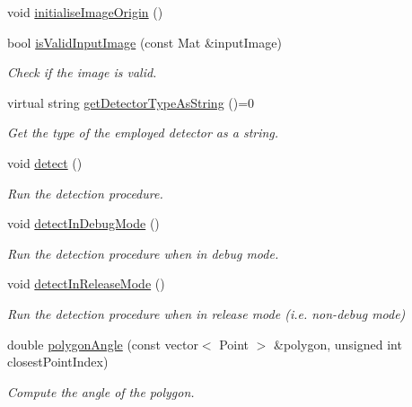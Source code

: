\begin{DoxyCompactItemize}
void \hyperlink{classmultiscale_1_1analysis_1_1Detector_a0d5677f992e9d9272eb70c08b86e9338}{initialise\-Image\-Origin} ()
\item 
bool \hyperlink{classmultiscale_1_1analysis_1_1Detector_ad0473d0ad9988c84ae88c9cf6adf19be}{is\-Valid\-Input\-Image} (const \-Mat \&input\-Image)
\begin{DoxyCompactList}\small\item\em \-Check if the image is valid. \end{DoxyCompactList}\item 
virtual string \hyperlink{classmultiscale_1_1analysis_1_1Detector_aeb7667ac14f48b58fd4601b11f09cc68}{get\-Detector\-Type\-As\-String} ()=0
\begin{DoxyCompactList}\small\item\em \-Get the type of the employed detector as a string. \end{DoxyCompactList}\item 
void \hyperlink{classmultiscale_1_1analysis_1_1Detector_ae0c0a72fef22d6521e82c18424a4dd04}{detect} ()
\begin{DoxyCompactList}\small\item\em \-Run the detection procedure. \end{DoxyCompactList}\item 
void \hyperlink{classmultiscale_1_1analysis_1_1Detector_aa9173a243a85e2d9cf493a641fb610aa}{detect\-In\-Debug\-Mode} ()
\begin{DoxyCompactList}\small\item\em \-Run the detection procedure when in debug mode. \end{DoxyCompactList}\item 
void \hyperlink{classmultiscale_1_1analysis_1_1Detector_a58665776f1a12659dae08d1a4a01050a}{detect\-In\-Release\-Mode} ()
\begin{DoxyCompactList}\small\item\em \-Run the detection procedure when in release mode (i.\-e. non-\/debug mode) \end{DoxyCompactList}\item 
double \hyperlink{classmultiscale_1_1analysis_1_1Detector_ada30f980ed5ce2f975bb827c393b8cd0}{polygon\-Angle} (const vector$<$ \-Point $>$ \&polygon, unsigned int closest\-Point\-Index)
\begin{DoxyCompactList}\small\item\em \-Compute the angle of the polygon. \end{DoxyCompactList}\item 

\end{DoxyCompactItemize}
